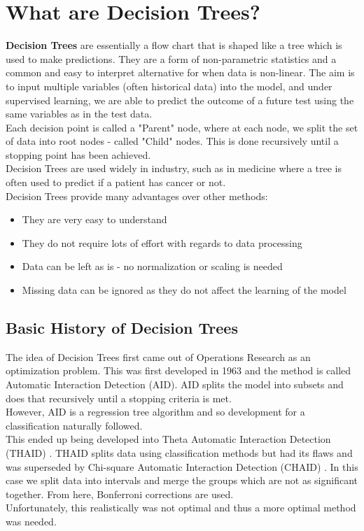 \documentclass[11pt,a4paper]{report}
\begin{document}
\section{What are Decision Trees?}
\textbf{Decision Trees} are essentially a flow chart that is shaped like a tree which is used to make predictions. 
They are a form of non-parametric statistics and a common and easy to interpret alternative for when data is non-linear.
The aim is to input multiple variables (often historical data) into the model, and under supervised learning, we are able to predict the outcome of a future test using the same variables as in the test data.\\
Each decision point is called a "Parent" node, where at each node, we split the set of data into root nodes - called "Child" nodes.
This is done recursively until a stopping point has been achieved.\\
Decision Trees are used widely in industry, such as in medicine where a tree is often used to predict if a patient has cancer or not. 
\medskip\\
Decision Trees provide many advantages over other methods:
\begin{itemize}
    \item They are very easy to understand
    
    \item They do not require lots of effort with regards to data processing
    
    \item Data can be left as is - no normalization or scaling is needed
    
    \item Missing data can be ignored as they do not affect the learning of the model
\end{itemize}

\subsection{Basic History of Decision Trees \cite{50years}} 
The idea of Decision Trees first came out of Operations Research as an optimization problem. This was first developed in 1963 \cite{AID} and the method is called Automatic Interaction Detection (AID).
AID splits the model into subsets and does that recursively until a stopping criteria is met.\\
However, AID is a regression tree algorithm and so development for a classification naturally followed.\\
This ended up being developed into Theta Automatic Interaction Detection (THAID) \cite{THAID}.
THAID splits data using classification methods but had its flaws and was superseded by Chi-square Automatic Interaction Detection (CHAID) \cite{CHAID}. 
In this case we split data into intervals and merge the groups which are not as significant together. From here, Bonferroni corrections are used.\\
Unfortunately, this realistically was not optimal and thus a more optimal method was needed.
\end{document}
